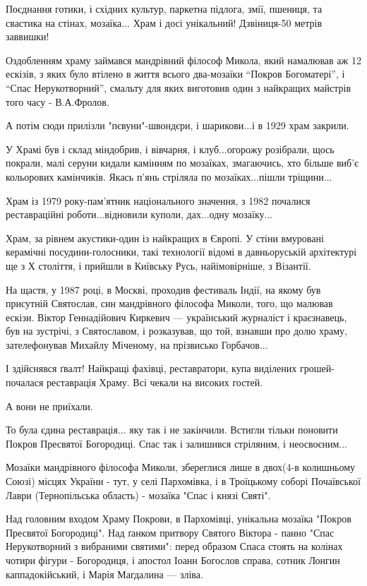 Поєднання готики, і східних культур, паркетна підлога, змії, пшениця, та
свастика на стінах, мозаїка...  Храм і досі унікальний! Дзвіниця-50 метрів
заввишки! 

Оздобленням храму займався мандрівний філософ Микола, який намалював аж 12
ескізів, з яких було втілено в життя всього два-мозаїки “Покров Богоматері”, і
“Спас Нерукотворний”, смальту для яких виготовив один з найкращих майстрів того
часу - В.А.Фролов.  

А потім сюди прилізли "пєвуни"-швондєри, і шарикови...і в 1929 храм закрили.

У Храмі був і склад міндобрив, і вівчарня, і клуб...огорожу розібрали, щось
покрали, малі серуни кидали камінням по мозаїках, змагаючись, хто більше виб'є
кольорових камінчиків. Якась п'янь стріляла по мозаїках...пішли тріщини...

Храм із 1979 року-пам'ятник національного значення, з 1982 почалися
реставраційні роботи...відновили куполи, дах...одну мозаїку...

Храм, за рівнем акустики-один із найкращих в Європі. У стіни вмуровані
керамічні посудини-голосники, такі технології відомі в давньоруській
архітектурі ще з Х століття, і прийшли в Київську Русь, найімовірніше, з
Візантії.

На щастя, у 1987 році, в Москві, проходив фестиваль Індії, на якому був
присутній Святослав, син мандрівного філософа Миколи, того, що малював ескізи.
Віктор Геннадійович Киркевич --- український журналіст і краєзнавець, був на
зустрічі, з Святославом, і розказував, що той, взнавши про долю храму,
зателефонував Михайлу Міченому, на прізвисько Горбачов...

І здійснявся ґвалт! Найкращі фахівці, реставратори, купа виділених
грошей-почалася реставрація Храму. Всі чекали на високих гостей.

А вони не приїхали.

То була єдина реставрація... яку так і не закінчили. Встигли тільки поновити
Покров Пресвятої Богородиці. Спас так і залишився стріляним, і неосвоєним...

Мозаїки мандрівного філософа Миколи, збереглися лише в двох(4-в колишньому
Союзі) місцях України - тут, у селі Пархомівка, і в Троїцькому соборі Почаївської
Лаври (Тернопільська область) - мозаїка "Спас і князі Святі".

Над головним входом Храму Покрови, в Пархомівці, унікальна мозаїка "Покров
Пресвятої Богородиці". Над ґанком притвору Святого Віктора - панно "Спас
Нерукотворний з вибраними святими": перед образом Спаса стоять на колінах
чотири фігури - Богородиця, і апостол Іоанн Богослов справа, сотник Лонгин
каппадокійський, і Марія Магдалина --- зліва. 

